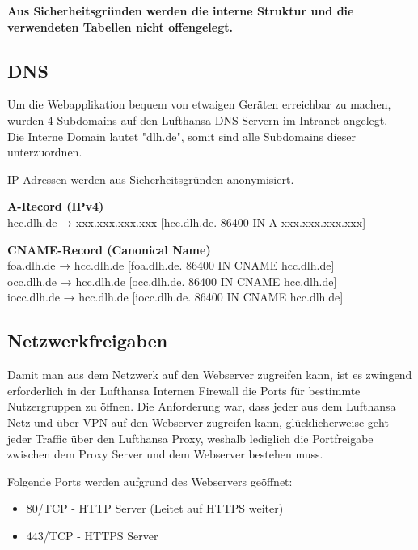 	{
		\noindent
		\textbf{Aus Sicherheitsgründen werden die interne Struktur und die verwendeten Tabellen nicht offengelegt.}
	}

	\subsection{DNS}

	{
		\noindent
		Um die Webapplikation bequem von etwaigen Geräten erreichbar zu machen, wurden 4 Subdomains auf den Lufthansa DNS Servern im Intranet angelegt.\\
		Die Interne Domain lautet "dlh.de", somit sind alle Subdomains dieser unterzuordnen.	
	}

	{
		\noindent
		IP Adressen werden aus Sicherheitsgründen anonymisiert.
	}
	
	\vspace{16pt}

	{
		\noindent
		\textbf{A-Record (IPv4)}\\
		hcc.dlh.de → xxx.xxx.xxx.xxx [hcc.dlh.de. 86400 IN A xxx.xxx.xxx.xxx]
	}

	\vspace{8pt}

	{
		\noindent
		\textbf{CNAME-Record (Canonical Name)}\\
		foa.dlh.de → hcc.dlh.de [foa.dlh.de. 86400 IN CNAME hcc.dlh.de]\\
		occ.dlh.de → hcc.dlh.de [occ.dlh.de. 86400 IN CNAME hcc.dlh.de]\\
		iocc.dlh.de → hcc.dlh.de [iocc.dlh.de. 86400 IN CNAME hcc.dlh.de]
	}
	

	

	\subsection{Netzwerkfreigaben}
	Damit man aus dem Netzwerk auf den Webserver zugreifen kann, ist es zwingend erforderlich in der Lufthansa Internen Firewall die Ports für bestimmte Nutzergruppen zu öffnen.
	Die Anforderung war, dass jeder aus dem Lufthansa Netz und über VPN auf den Webserver zugreifen kann, glücklicherweise geht jeder Traffic über den Lufthansa Proxy, weshalb lediglich die Portfreigabe zwischen dem Proxy Server und dem Webserver bestehen muss.
	
	Folgende Ports werden aufgrund des Webservers geöffnet:

	\begin{itemize}
		\item 80/TCP - HTTP Server (Leitet auf HTTPS weiter)
		\item 443/TCP - HTTPS Server
	\end{itemize}